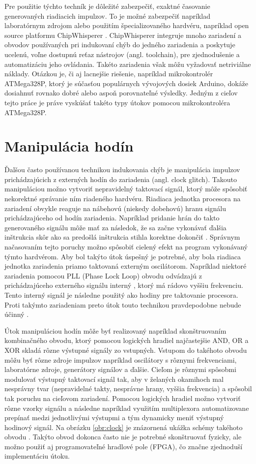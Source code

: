 Pre použitie týchto techník je dôležité zabezpečiť, exaktné časovanie generovaných riadiacich impulzov. To je možné zabezpečiť napríklad laboratórnym zdrojom alebo použitím špecializovaného hardvéru, napríklad open source platformu ChipWhisperer \cite{chipwhisperer}. ChipWhisperer integruje mnoho zariadení a obvodov používaných pri indukovaní chýb do jedného zariadenia a poskytuje ucelenú, voľne dostupnú reťaz nástrojov (angl. toolchain), pre zjednodušenie a automatizáciu jeho ovládania. Takéto zariadenia však môžu vyžadovať netriviálne náklady. Otázkou je, či aj lacnejšie riešenie, napríklad mikrokontrolér ATMega328P, ktorý je súčasťou populárnych vývojových dosiek Arduino, dokáže dosiahnuť rovnako dobré alebo aspoň porovnateľné výsledky. Jedným z cieľov tejto práce je práve vyskúšať takéto typy útokov pomocou mikrokontroléra ATMega328P.

\section{Manipulácia hodín}
Ďalšou často používanou technikou indukovania chýb je manipulácia impulzov prichádzajúcich z externých hodín do zariadenia (angl. clock glitch). Takouto manipuláciou možno vytvoriť nepravidelný taktovací signál, ktorý môže spôsobiť nekorektné správanie ním riadeného hardvéru. Riadiaca jednotka procesora na zariadení obvykle reaguje na nábehovú (niekedy dobehovú) hranu signálu prichádzajúceho od hodín zariadenia. Napríklad pridanie hrán do takto generovaného signálu môže mať za následok, že sa začne vykonávať ďalšia inštrukcia skôr ako sa predošlá inštrukcia stihla korektne dokončiť \cite{clock}. Správnym načasovaním tejto poruchy možno spôsobiť cielený efekt na program vykonávaný týmto hardvérom. Aby bol takýto útok úspešný je potrebné, aby bola riadiaca jednotka zariadenia priamo taktovaná externým oscilátorom. Napríklad niektoré zariadenia pomocou PLL (Phase Lock Loop) obvodu odvádzajú z prichádzajúceho externého signálu interný \cite{stmReference}, ktorý má rádovo vyššiu frekvenciu. Tento interný signál je následne použitý ako hodiny pre taktovanie procesora. Proti takýmto zariadeniam preto útok touto technikou pravdepodobne nebude účinný \cite{crowbars}.

Útok manipuláciou hodín môže byť realizovaný napríklad skonštruovaním kombinačného obvodu, ktorý pomocou logických hradiel najčastejšie AND, OR a XOR skladá rôzne výstupné signály zo vstupných. Vstupom do takéhoto obvodu môžu byť rôzne zdroje impulzov napríklad oscilátory s rôznymi frekvenciami, laboratórne zdroje, generátory signálov a ďalšie. Cieľom je rôznymi spôsobmi modulovať výstupný taktovací signál tak, aby v želaných okamihoch mal nesprávny tvar (nepravidelné takty, nesprávne hrany, vyššia frekvencia) a spôsobil tak poruchu na cieľovom zariadení. Pomocou logických hradiel možno vytvoriť rôzne vzorky signálu a následne napríklad využitím multiplexora automatizovane prepínať medzi jednotlivými výstupmi a tým dynamicky meniť výstupný hodinový signál. Na obrázku \ref{obr:clock} je znázornená ukážka schémy takéhoto obvodu \cite{clockCircuit}. Takýto obvod dokonca často nie je potrebné skonštruovať fyzicky, ale možno použiť aj programovateľné hradlové pole (FPGA), čo značne zjednoduší implementáciu útoku.

